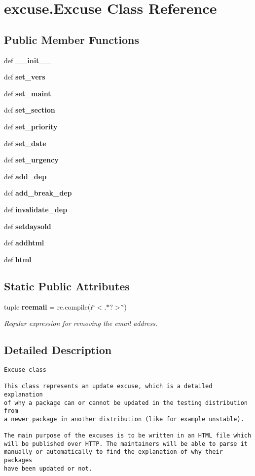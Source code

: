 \section{excuse.Excuse Class Reference}
\label{classexcuse_1_1Excuse}
\subsection*{Public Member Functions}
\begin{CompactItemize}
\item 
def {\bf \_\-\_\-init\_\-\_\-}
\item 
def {\bf set\_\-vers}
\item 
def {\bf set\_\-maint}
\item 
def {\bf set\_\-section}
\item 
def {\bf set\_\-priority}
\item 
def {\bf set\_\-date}
\item 
def {\bf set\_\-urgency}
\item 
def {\bf add\_\-dep}
\item 
def {\bf add\_\-break\_\-dep}
\item 
def {\bf invalidate\_\-dep}
\item 
def {\bf setdaysold}
\item 
def {\bf addhtml}
\item 
def {\bf html}
\end{CompactItemize}
\subsection*{Static Public Attributes}
\begin{CompactItemize}
\item 
tuple {\bf reemail} = re.compile(r\char`\"{}$<$.$\ast$?$>$\char`\"{})\label{classexcuse_1_1Excuse_bb15f55eed8f034db8a64b4ddc46460d}

\begin{CompactList}\small\item\em Regular expression for removing the email address. \item\end{CompactList}\end{CompactItemize}


\subsection{Detailed Description}


\footnotesize\begin{verbatim}Excuse class

This class represents an update excuse, which is a detailed explanation
of why a package can or cannot be updated in the testing distribution from
a newer package in another distribution (like for example unstable).

The main purpose of the excuses is to be written in an HTML file which
will be published over HTTP. The maintainers will be able to parse it
manually or automatically to find the explanation of why their packages
have been updated or not.
\end{verbatim}
\normalsize
 



